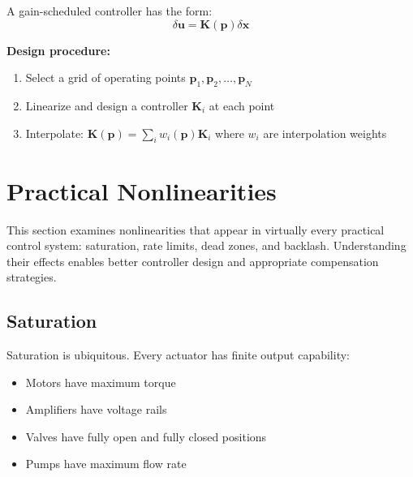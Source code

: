A gain-scheduled controller has the form:
\begin{equation}
\delta\mathbf{u} = \mathbf{K}(\mathbf{p})\delta\mathbf{x}
\end{equation}

\textbf{Design procedure:}
\begin{enumerate}
    \item Select a grid of operating points $\mathbf{p}_1, \mathbf{p}_2, \ldots, \mathbf{p}_N$
    \item Linearize and design a controller $\mathbf{K}_i$ at each point
    \item Interpolate: $\mathbf{K}(\mathbf{p}) = \sum_i w_i(\mathbf{p})\mathbf{K}_i$ where $w_i$ are interpolation weights
\end{enumerate}


\section{Practical Nonlinearities}
\label{sec:practical_nonlinearities}

This section examines nonlinearities that appear in virtually every practical control system: saturation, rate limits, dead zones, and backlash. Understanding their effects enables better controller design and appropriate compensation strategies.

\subsection{Saturation}

Saturation is ubiquitous. Every actuator has finite output capability:
\begin{itemize}
    \item Motors have maximum torque
    \item Amplifiers have voltage rails
    \item Valves have fully open and fully closed positions
    \item Pumps have maximum flow rate
\end{itemize}

